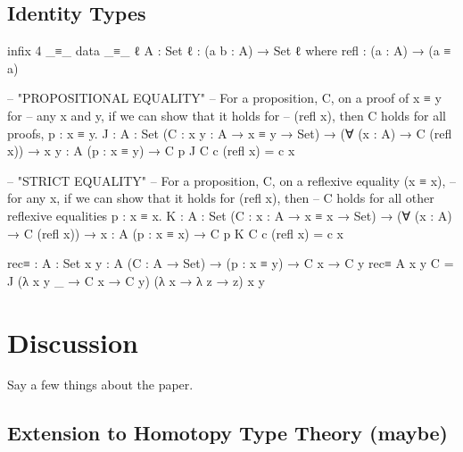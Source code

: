 \documentclass[12pt]{article}
\begin{document}
\subsection*{Identity Types}
\begin{center}
\begin{minipage}{0.9\textwidth}
\begin{code}
infix  4  _≡_
data _≡_ {ℓ} {A : Set ℓ} : (a b : A) → Set ℓ where
  refl : (a : A) → (a ≡ a)

-- "PROPOSITIONAL EQUALITY"
-- For a proposition, C, on a proof of x ≡ y for
-- any x and y, if we can show that it holds for
-- (refl x), then C holds for all proofs, p : x ≡ y.
J : {A : Set} (C : {x y : A} → x ≡ y → Set) →
    (∀ (x : A) → C (refl x)) →
    {x y : A} (p : x ≡ y) → C p
J C c (refl x) = c x

-- "STRICT EQUALITY"
-- For a proposition, C, on a reflexive equality (x ≡ x),
-- for any x, if we can show that it holds for (refl x), then
-- C holds for all other reflexive equalities p : x ≡ x.
K : {A : Set} (C : {x : A} → x ≡ x → Set) →
    (∀ (x : A) → C (refl x)) →
    {x : A} (p : x ≡ x) → C p
K C c (refl x) = c x

rec≡ : {A : Set} {x y : A} (C : A → Set) →
       (p : x ≡ y) → C x → C y
rec≡ {A} {x} {y} C = 
  J (λ {x} {y} _ → C x → C y)
    (λ x → λ z → z)
    {x} {y} 
\end{code}
\end{minipage}
\end{center}

\section{Discussion}
Say a few things about the paper.

\subsection*{Extension to Homotopy Type Theory (maybe)}
\end{document}
